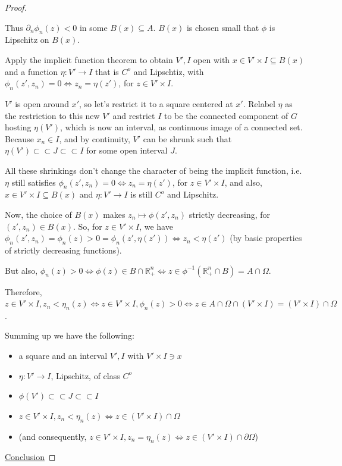 \documentclass[english,a4paper,9pt,oneside]{scrbook}	%
\theoremstyle{break}
\newenvironment{mproof}[1][\proofname]{%
  \begin{proof}[#1]$ $\par\nobreak\ignorespaces
}{%
  \end{proof}
}
\renewcommand*{\proofname}{Proof}
\theoremstyle{remark}
\newcommand{\mR}{\mathbb{R}}
\newcommand{\cc}{\subset\subset}
\begin{document}
\begin{mproof}
Thus $\partial_n\phi_n(z)<0$ in some $B(x)\subseteq A$. $B(x)$ is chosen small that $\phi$ is Lipschitz on $B(x)$.

Apply the implicit function theorem to obtain $V',I$ open with $x \in V'\times I\subseteq B(x)$ and a function $\eta:V'\rightarrow I$ that is $C^o$ and Lipschtiz, with $\phi_n(z',z_n)=0 \iff z_n = \eta(z')$, for $z \in V'\times I$.

$V'$ is open around $x'$, so let's restrict it to a square centered at $x'$. Relabel $\eta$ as the restriction to this new $V'$ and restrict $I$ to be the connected component of $G$ hosting $\eta(V')$, which is now an interval, as continuous image of a connected set. Because $x_n \in I$, and by continuity, $V'$ can be shrunk such that $\eta(V')\cc J \cc I$ for some open interval $J$. 

All these shrinkings don't change the character of being the implicit function, i.e. $\eta$ still satisfies $\phi_n(z',z_n)=0 \iff z_n = \eta(z')$, for $z \in V'\times I$, and also,  $x \in V'\times I\subseteq B(x)$ and $\eta:V'\rightarrow I$ is still $C^o$ and Lipschitz.

Now, the choice of $B(x)$ makes $z_n\mapsto \phi(z',z_n)$ strictly decreasing, for $(z',z_n) \in B(x)$.  So, for $z \in V'\times I$, we have $\phi_n(z', z_n) = \phi_n(z)>0=\phi_n(z',\eta(z')) \iff z_n<\eta(z')$ (by basic properties of strictly decreasing functions).

But also, $\phi_n(z) >0 \iff \phi(z) \in B\cap \mR^n_+ \iff z \in \phi^{-1}(\mR^n_+\cap B)=A\cap \Omega$.

Therefore, $z \in V'\times I, z_n<\eta_n(z) \iff z \in V'\times I, \phi_n(z) >0 \iff z \in A\cap \Omega \cap (V'\times I) = (V'\times I)\cap \Omega$.

Summing up we have the following:

\begin{itemize}
	\item a square and an interval $V', I$ with $V'\times I \ni x$
	\item $\eta: V'\rightarrow I$, Lipschitz, of class $C^o$
	\item $\phi(V') \cc J \cc I$
	\item $z \in V'\times I, z_n<\eta_n(z) \iff z \in (V'\times I)\cap \Omega$
	\item (and consequently, $z \in V'\times I, z_n=\eta_n(z) \iff z \in (V'\times I)\cap \partial \Omega$)
\end{itemize}

\underline{Conclusion}


\end{mproof}
\end{document}

